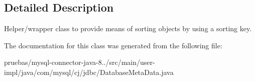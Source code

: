 \subsection{Detailed Description}
Helper/wrapper class to provide means of sorting objects by using a sorting key. 

The documentation for this class was generated from the following file\+:\begin{DoxyCompactItemize}
\item 
pruebas/mysql-\/connector-\/java-\/8../src/main/user-\/impl/java/com/mysql/cj/jdbc/Database\+Meta\+Data.\+java\end{DoxyCompactItemize}
